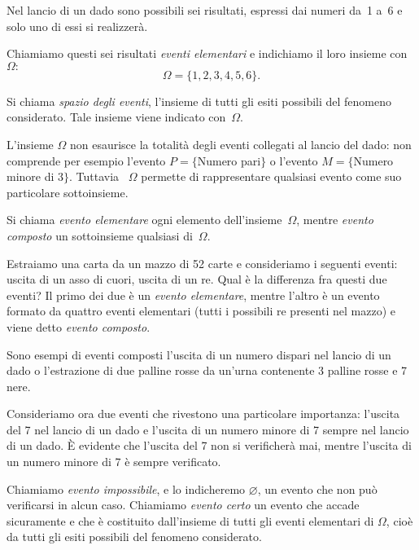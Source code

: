 Nel lancio di un dado sono possibili sei risultati, espressi dai numeri 
da~1 a~6 e solo uno di essi si realizzerà.

Chiamiamo questi sei risultati \emph{eventi elementari} e indichiamo il 
loro insieme con 
$\Omega:$ 
\[\Omega =\{1,2,3,4,5,6\}.\]

\begin{definizione}
Si chiama \emph{spazio degli eventi}, l'insieme di tutti gli esiti 
possibili del fenomeno considerato. 
Tale insieme viene indicato con~$\Omega$.
\end{definizione}

L'insieme $\Omega $ non esaurisce la totalità degli eventi collegati al 
lancio del dado: non comprende per esempio 
l'evento $P=\{$Numero pari$\}$ o 
l'evento $M=\{$Numero minore di $3\}$. 
Tuttavia~ $\Omega $ permette di rappresentare qualsiasi evento come suo 
particolare sottoinsieme.

\begin{definizione}
Si chiama \emph{evento elementare} ogni elemento 
dell'insieme~$\Omega$, 
mentre \emph{evento composto} un sottoinsieme qualsiasi di~$\Omega$.
\end{definizione}

Estraiamo una carta da un mazzo di 52 carte e consideriamo i seguenti 
eventi: 
uscita di un asso di cuori, uscita di un re. Qual è la differenza fra 
questi due eventi? 
Il primo dei due è un \emph{evento elementare}, mentre l'altro è un 
evento formato da quattro eventi elementari (tutti i possibili re presenti 
nel mazzo) e viene detto \emph{evento composto}.

Sono esempi di eventi composti l'uscita di un numero dispari nel lancio di 
un dado o l'estrazione di due palline rosse da un'urna contenente 3 palline 
rosse e 7 nere.

Consideriamo ora due eventi che rivestono una particolare importanza: 
l'uscita del 7 nel lancio di un dado e l'uscita di un numero minore di 7 
sempre nel lancio di un dado. 
È evidente che l'uscita del 7 non si verificherà mai, 
mentre l'uscita di un numero minore di 7 è sempre verificato.

\begin{definizione}
Chiamiamo \emph{evento impossibile}, e lo indicheremo $\varnothing$, un 
evento che non può verificarsi in alcun caso.
Chiamiamo \emph{evento certo} un evento che accade sicuramente e che è 
costituito dall'insieme di tutti gli eventi elementari di $\Omega $, cioè 
da tutti gli esiti possibili del fenomeno considerato.
\end{definizione}


